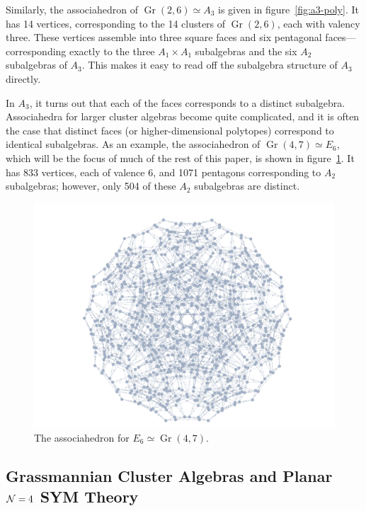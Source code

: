 \documentclass[11pt]{article}
\DeclareMathOperator{\Gr}{Gr}
\begin{document}
Similarly, the associahedron of $\Gr(2,6) \simeq A_3$ is given in figure~\ref{fig:a3-poly}. It has 14 vertices, corresponding to the 14 clusters of $\Gr(2,6)$, each with valency three. These vertices assemble into three square faces and six pentagonal faces---corresponding exactly to  the three $A_1 \times A_1$ subalgebras and the six $A_2$ subalgebras of $A_3$. This makes it easy to read off the subalgebra structure of $A_3$ directly. 

In $A_3$, it turns out that each of the faces corresponds to a distinct subalgebra. Associahedra for larger cluster algebras become quite complicated, and it is often the case that distinct faces (or higher-dimensional polytopes) correspond to identical subalgebras. As an example, the associahedron of $\Gr(4,7)\simeq E_6$, which will be the focus of much of the rest of this paper, is shown in figure~\ref{fig:e6-poly}. It has 833 vertices, each of valence 6, and 1071 pentagons corresponding to $A_2$ subalgebras; however, only 504 of these $A_2$ subalgebras are distinct.

\begin{figure}[t]  \centering
  \includegraphics[scale=0.25]{e6-associahedron}
  \caption{The associahedron for $E_6\simeq\Gr(4,7)$.}
  \label{fig:e6-poly}
\end{figure}

\subsection{Grassmannian Cluster Algebras and Planar ${\cal N} = 4$ SYM Theory}
\end{document}
